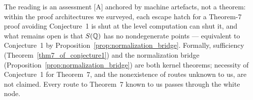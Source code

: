 The reading is an assessment [A] anchored by machine artefacts, not a theorem: within the
proof architectures we surveyed, each escape hatch for a Theorem-7 proof avoiding
Conjecture~1 is shut at the level computation can shut it, and what remains open is that
$S(\mathbb{Q})$ has no nondegenerate points --- equivalent to Conjecture~1 by
Proposition~\ref{prop:normalization_bridge}.  Formally, sufficiency
(Theorem~\ref{thm7_of_conjecture1}) and the normalization bridge
(Proposition~\ref{prop:normalization_bridge}) are both kernel theorems; necessity of
Conjecture~1 for Theorem~7, and the nonexistence of routes unknown to us, are not
claimed.  Every route to Theorem~7 known to us passes through the
white node.
